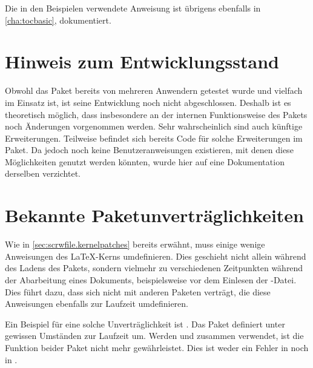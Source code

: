 %
Die in den Beispielen verwendete Anweisung
 ist übrigens ebenfalls in
\autoref{cha:tocbasic}, 
dokumentiert.%
\EndIndexGroup


\section{Hinweis zum Entwicklungsstand}

Obwohl das Paket bereits von mehreren Anwendern getestet wurde und vielfach im
Einsatz ist, ist seine Entwicklung noch nicht abgeschlossen. Deshalb ist es
theoretisch möglich, dass insbesondere an der internen Funktionsweise des
Pakets noch Änderungen vorgenommen werden. Sehr wahrscheinlich sind auch
künftige Erweiterungen. Teilweise befindet sich bereits Code für solche
Erweiterungen im Paket. Da jedoch noch keine Benutzeranweisungen existieren,
mit denen diese Möglichkeiten genutzt werden könnten, wurde hier auf eine
Dokumentation derselben verzichtet.


\section{Bekannte Paketunverträglichkeiten}

Wie in \autoref{sec:scrwfile.kernelpatches} bereits erwähnt, muss
 einige wenige Anweisungen des \LaTeX-Kerns
umdefinieren. Dies geschieht nicht allein während des Ladens des Pakets,
sondern vielmehr zu verschiedenen Zeitpunkten während der Abarbeitung eines
Dokuments, beispielsweise vor dem Einlesen der
-Datei. Dies führt dazu, dass 
sich nicht mit anderen Paketen verträgt, die diese Anweisungen ebenfalls zur
Laufzeit umdefinieren.

Ein Beispiel für eine solche Unverträglichkeit ist
. Das
Paket definiert unter gewissen Umständen  zur Laufzeit
um. Werden  und  zusammen verwendet, ist
die Funktion beider Paket nicht mehr gewährleistet. Dies ist weder ein Fehler
in  noch in .%
%
\EndIndexGroup



